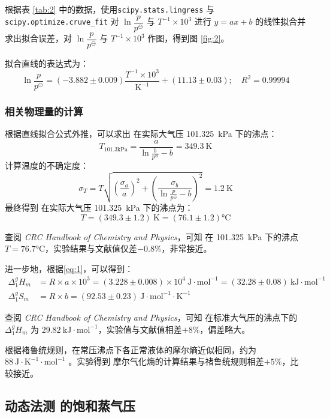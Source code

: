 根据表 \ref{tab:2} 中的数据，使用\texttt{scipy.stats.lingress} 与 \texttt{scipy.optimize.cruve\_fit} 对 \(\ln \dfrac{p}{p^\ominus}\) 与 \(T^{-1}\times10^{3}\) 进行 $y=ax+b$ 的线性拟合并求出拟合误差，对 \(\ln \dfrac{p}{p^\ominus}\) 与 \(T^{-1}\times10^{3}\) 作图，得到图 \ref{fig:2}。

拟合直线的表达式为：
\[
    \ln \dfrac{p}{p^\ominus} = (-3.882 \pm 0.009)\dfrac{T^{-1}\times10^{3}}{\mathrm{K^{-1}}} + (11.13\pm 0.03);\quad R^2 = 0.99994
\]

\subsubsection{ 相关物理量的计算}

根据直线拟合公式外推，可以求出  在实际大气压 \SI{101.325}{kPa} 下的沸点：
\[
T_{101.3 \mathrm{kPa}}=\frac{a}{\ln \frac{b}{p^{\otimes}}-b}=349.3 \mathrm{~K}
\]
计算温度的不确定度：
\[
\sigma_T=T \sqrt{\left(\frac{\sigma_a}{a}\right)^2+\left(\frac{\sigma_b}{\ln \frac{p}{p^{\ominus}}-b}\right)^2}=1.2 \mathrm{~K}
\]
最终得到  在实际大气压 \SI{101.325}{kPa} 下的沸点为：
\[
T = (349.3\pm1.2) \mathrm{~K} = (76.1\pm1.2)\si{\celsius}
\]

查阅 \textit{CRC Handbook of Chemistry and Physics}\cite{haynes2016crc}，可知  在 \SI{101.325}{kPa} 下的沸点 $T = 76.7\si{\celsius}$，实验结果与文献值仅差$-0.8\%$，非常接近。

进一步地，根据\eqref{eq:1}，可以得到：
\[
\begin{aligned}
    \Delta_1^{g} H_m &= R\times a\times 10^{3} = (3.228\pm0.008)\times10^{4}\mathrm{~J\cdot mol^{-1}} = (32.28\pm 0.08)\mathrm{~kJ\cdot mol^{-1}}\\
    \Delta_1^{g} S_m &= R\times b = (92.53\pm 0.23)\mathrm{~J\cdot mol^{-1}\cdot K^{-1}}
\end{aligned}
\]

查阅 \textit{CRC Handbook of Chemistry and Physics}\cite{haynes2016crc}，可知  在标准大气压的沸点下的 $\Delta_1^{g} H_m$ 为 $29.82\mathrm{~kJ\cdot mol^{-1}}$，实验值与文献值相差$+8\%$，偏差略大。

根据褚鲁统规则，在常压沸点下各正常液体的摩尔熵近似相同，约为 $88 \mathrm{~J} \cdot \mathrm{K}^{-1} \cdot \mathrm{mol}^{-1}$ 。实验得到  摩尔气化熵的计算结果与禇鲁统规则相差$+5\%$，比较接近。


\subsection{动态法测  的饱和蒸气压}


